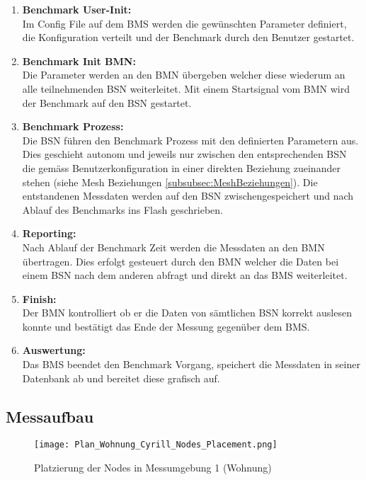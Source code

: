 \begin{enumerate}
	\item \textbf{Benchmark User-Init:}\\
	Im Config File auf dem BMS werden die gewünschten Parameter definiert, die Konfiguration verteilt und der Benchmark durch den Benutzer gestartet.
	\item \textbf{Benchmark Init BMN:}\\
	Die Parameter werden an den BMN übergeben welcher diese wiederum an alle teilnehmenden BSN weiterleitet. Mit einem Startsignal vom BMN wird der Benchmark auf den BSN gestartet.
	\item \textbf{Benchmark Prozess:}\\
	Die BSN führen den Benchmark Prozess mit den definierten Parametern aus. Dies geschieht autonom und jeweils nur zwischen den entsprechenden BSN die gemäss Benutzerkonfiguration in einer direkten Beziehung zueinander stehen (siehe Mesh Beziehungen \ref{subsubsec:MeshBeziehungen}). Die entstandenen Messdaten werden auf den BSN zwischengespeichert und nach Ablauf des Benchmarks ins Flash geschrieben.
	\item \textbf{Reporting:}\\
	Nach Ablauf der Benchmark Zeit werden die Messdaten an den BMN übertragen. Dies erfolgt gesteuert durch den BMN welcher die Daten bei einem BSN nach dem anderen abfragt und direkt an das BMS weiterleitet.
	\item \textbf{Finish:}\\
	Der BMN kontrolliert ob er die Daten von sämtlichen BSN korrekt auslesen konnte und bestätigt das Ende der Messung gegenüber dem BMS.
	\item \textbf{Auswertung:}\\
	Das BMS beendet den Benchmark Vorgang, speichert die Messdaten in seiner Datenbank ab und bereitet diese grafisch auf. 
\end{enumerate}

\subsection{Messaufbau}\label{subsec:Messaufbau}


\begin{figure}[H]
	\centering
	\texttt{[image: Plan\_Wohnung\_Cyrill\_Nodes\_Placement.png]}
	\caption{Platzierung der Nodes in Messumgebung 1 (Wohnung)}\label{fig:PlatzierungderNodesinMessumgebung1}
\end{figure}

